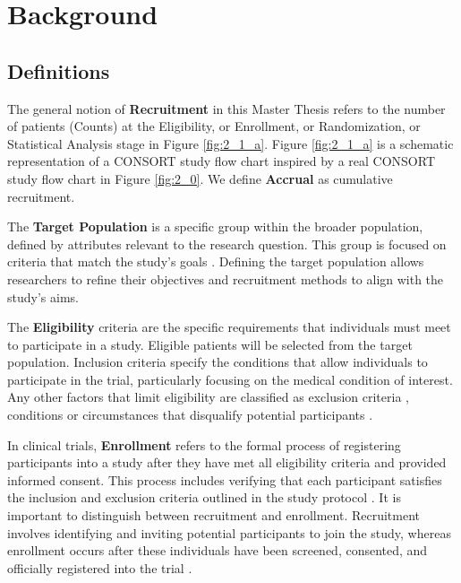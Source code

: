 








\chapter{Background} 

\section{Definitions}

The general notion of \textbf{Recruitment} in this Master Thesis refers to the number of patients (Counts) at the Eligibility, or Enrollment, or Randomization, or Statistical Analysis stage in Figure \ref{fig:2_1_a}. Figure \ref{fig:2_1_a} is a schematic representation of a CONSORT study flow chart \citep{schulz2010consort, hopewell2025consort} inspired by a real CONSORT study flow chart in Figure \ref{fig:2_0}. We define \textbf{Accrual} as cumulative recruitment.

The \textbf{Target Population} is a specific group within the broader population, defined by attributes relevant to the research question. This group is focused on criteria that match the study's goals \citep{willie2024population}. Defining the target population allows researchers to refine their objectives and recruitment methods to align with the study's aims.


The \textbf{Eligibility} criteria are the specific requirements that individuals must meet to participate in a study. Eligible patients will be selected from the target population. Inclusion criteria specify the conditions that allow individuals to participate in the trial, particularly focusing on the medical condition of interest. Any other factors that limit eligibility are classified as exclusion criteria \citep{van2007eligibility}, conditions or circumstances that disqualify potential participants \citep{food2018evaluating}.


In clinical trials, \textbf{Enrollment} refers to the formal process of registering participants into a study after they have met all eligibility criteria and provided informed consent. This process includes verifying that each participant satisfies the inclusion and exclusion criteria outlined in the study protocol \citep{NIH2021}. It is important to distinguish between recruitment and enrollment. Recruitment involves identifying and inviting potential participants to join the study, whereas enrollment occurs after these individuals have been screened, consented, and officially registered into the trial \citep{frank2004current}. 

